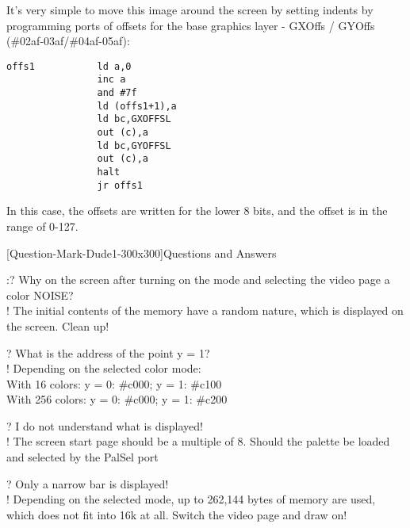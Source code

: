It’s very simple to move this image around the screen by setting
indents by programming ports of offsets for the base graphics layer -
GXOffs / GYOffs (\#02af-03af/\#04af-05af):
\begin{verbatim}
offs1           ld a,0
                inc a
                and #7f
                ld (offs1+1),a
                ld bc,GXOFFSL
                out (c),a
                ld bc,GYOFFSL
                out (c),a
                halt
                jr offs1
\end{verbatim}
In this case, the offsets are written for the lower 8 bits, and the
offset is in the range of 0-127.

[Question-Mark-Dude1-300x300]Questions and Answers

:? Why on the screen after turning on the mode and selecting the video
page a color NOISE?\\
! The initial contents of the memory have a random nature, which is
displayed on the screen. Clean up!

? What is the address of the point y = 1?\\
! Depending on the selected color mode:\\
With 16 colors: y = 0: \#c000; y = 1: \#c100\\
With 256 colors: y = 0: \#c000; y = 1: \#c200

? I do not understand what is displayed!\\
! The screen start page should be a multiple of 8. Should the palette
be loaded and selected by the PalSel port

? Only a narrow bar is displayed!\\
! Depending on the selected mode, up to 262,144 bytes of memory are
used, which does not fit into 16k at all.  Switch the video page and
draw on!

